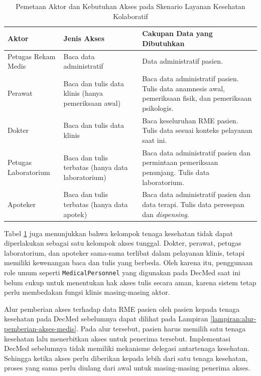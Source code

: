 \documentclass[bahasa, 12pt, a4paper, onecolumn, oneside, final]{report}
\begin{document}
\begin{table}[!ht]
	\centering
	\caption{Pemetaan Aktor dan Kebutuhan Akses pada Skenario Layanan Kesehatan Kolaboratif}
	\label{tab:skenario-layanan-kolaboratif}
	\small
	\begin{tabular}{|p{}|p{}|p{}|}
		\hline
		\textbf{Aktor}       & \textbf{Jenis Akses}                                & \textbf{Cakupan Data yang Dibutuhkan}                                                                     \\ \hline
		Petugas Rekam Medis  & Baca data administratif                             & Data administratif pasien.                                                                                \\ \hline
		Perawat              & Baca dan tulis data klinis (hanya pemeriksaan awal) & Baca data administratif pasien. Tulis data anamnesis awal, pemeriksaan fisik, dan pemeriksaan psikologis. \\ \hline
		Dokter               & Baca dan tulis data klinis                          & Baca keseluruhan RME pasien. Tulis data sesuai konteks pelayanan saat ini.                                \\ \hline
		Petugas Laboratorium & Baca dan tulis terbatas (hanya data laboratorium)   & Baca data administratif pasien dan permintaan pemeriksaan penunjang. Tulis data laboratorium.             \\ \hline
		Apoteker             & Baca dan tulis terbatas (hanya data apotek)         & Baca data administratif pasien dan data terapi. Tulis data peresepan dan \textit{dispensing}.             \\ \hline
	\end{tabular}
\end{table}

Tabel \ref{tab:skenario-layanan-kolaboratif} juga menunjukkan bahwa kelompok tenaga kesehatan tidak dapat diperlakukan sebagai satu kelompok akses tunggal. Dokter, perawat, petugas laboratorium, dan apoteker sama-sama terlibat dalam pelayanan klinis, tetapi memiliki kewenangan baca dan tulis yang berbeda. Oleh karena itu, penggunaan role umum seperti \texttt{MedicalPersonnel} yang digunakan pada DecMed saat ini belum cukup untuk menentukan hak akses tulis secara aman, karena sistem tetap perlu membedakan fungsi klinis masing-masing aktor.

Alur pemberian akses terhadap data RME pasien oleh pasien kepada tenaga kesehatan pada DecMed sebelumnya dapat dilihat pada Lampiran \ref{lampiran:alur-pemberian-akses-medis}. Pada alur tersebut, pasien harus memilih satu tenaga kesehatan lalu menerbitkan akses untuk penerima tersebut. Implementasi DecMed sebelumnya tidak memiliki mekanisme delegasi antartenaga kesehatan. Sehingga ketika akses perlu diberikan kepada lebih dari satu tenaga kesehatan, proses yang sama perlu diulang dari awal untuk masing-masing penerima akses.
\end{document}
